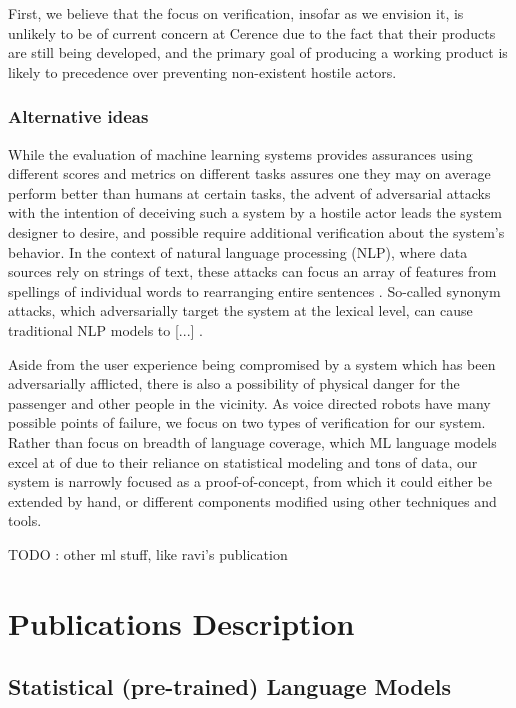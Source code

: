 \documentclass{article}
\begin{document}
First, we believe that the focus on verification, insofar as we envision it, is
unlikely to be of current concern at Cerence due to the fact that their products
are still being developed, and the primary goal of producing a working product
is likely to precedence over preventing non-existent hostile actors.

\subsubsection{Alternative ideas}

While the evaluation of machine learning systems provides assurances using
different scores and metrics on different tasks assures one they may on average
perform better than humans at certain tasks, the advent of adversarial attacks
\cite{szegedy} with the intention of deceiving such a system by a hostile actor
leads the system designer to desire, and possible require additional
verification about the system's behavior. In the context of natural language
processing (NLP), where data sources rely on strings of text, these attacks can
focus an array of features from spellings of individual words to rearranging
entire sentences \cite{}. So-called synonym attacks, which adversarially target
the system at the lexical level, can cause traditional NLP models to [...]
\cite{}.


Aside from the user experience being compromised by a system which has been
adversarially afflicted, there is also a possibility of physical danger for the
passenger and other people in the vicinity. As voice directed robots have many
possible points of failure, we focus on two types of verification for our
system. Rather than focus on breadth of language coverage, which ML language
models excel at of due to their reliance on statistical modeling and tons
of data, our system is narrowly focused as a proof-of-concept, from which it
could either be extended by hand, or different components modified using
other techniques and tools.

TODO : other ml stuff, like ravi's publication

\section{Publications Description}

\subsection{Statistical (pre-trained) Language Models}
\end{document}

